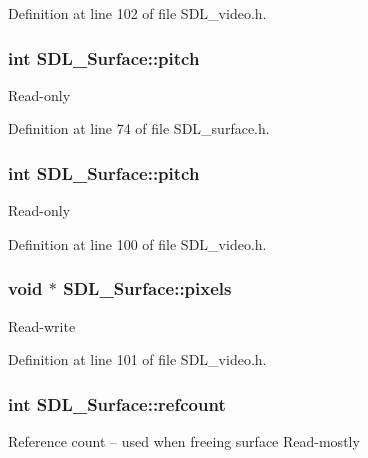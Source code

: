 Definition at line 102 of file S\+D\+L\+\_\+video.\+h.

\hypertarget{structSDL__Surface_a5fa37325d77d65b2ed64ffc7cd01bb6c}{
\subsubsection[{pitch}]{\setlength{\rightskip}{0pt plus 5cm}int S\+D\+L\+\_\+\+Surface\+::pitch}}\label{structSDL__Surface_a5fa37325d77d65b2ed64ffc7cd01bb6c}
Read-\/only 

Definition at line 74 of file S\+D\+L\+\_\+surface.\+h.

\hypertarget{structSDL__Surface_a5fa37325d77d65b2ed64ffc7cd01bb6c}{
\subsubsection[{pitch}]{\setlength{\rightskip}{0pt plus 5cm}int S\+D\+L\+\_\+\+Surface\+::pitch}}\label{structSDL__Surface_a5fa37325d77d65b2ed64ffc7cd01bb6c}
Read-\/only 

Definition at line 100 of file S\+D\+L\+\_\+video.\+h.

\hypertarget{structSDL__Surface_ada4bbb4e87ef8c52fb5b234ce45b3978}{
\subsubsection[{pixels}]{\setlength{\rightskip}{0pt plus 5cm}void $\ast$ S\+D\+L\+\_\+\+Surface\+::pixels}}\label{structSDL__Surface_ada4bbb4e87ef8c52fb5b234ce45b3978}
Read-\/write 

Definition at line 101 of file S\+D\+L\+\_\+video.\+h.

\hypertarget{structSDL__Surface_a03d10628a359c0674f5ceffd574f1641}{
\subsubsection[{refcount}]{\setlength{\rightskip}{0pt plus 5cm}int S\+D\+L\+\_\+\+Surface\+::refcount}}\label{structSDL__Surface_a03d10628a359c0674f5ceffd574f1641}
Reference count -- used when freeing surface Read-\/mostly 

